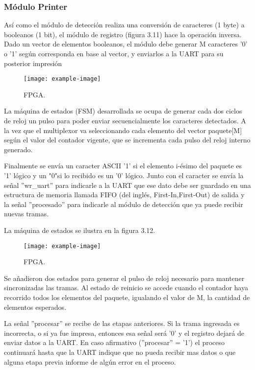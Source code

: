 \subsubsection{Módulo Printer}

\lipsum[1]

Así como el módulo de detección realiza una conversión de caracteres (1 byte) a booleanos (1 bit), el módulo de registro (figura 3.11) hace la operación inversa. Dado un vector de elementos booleanos, el módulo debe generar M caracteres ’0’
o ’1’ según corresponda en base al vector, y enviarlos a la UART para su posterior impresión

\begin{figure}[H]
	\centering
	\texttt{[image: example-image]}
	\centering\caption{FPGA.}
	\label{fig:XXX}
\end{figure}

La máquina de estados (FSM) desarrollada se ocupa de generar cada dos ciclos de reloj un pulso para poder enviar secuencialmente los caracteres detectados. A la vez que el multiplexor va seleccionando cada elemento del vector paquete[M] según el valor del contador vigente, que se incrementa cada pulso del reloj interno
generado.

Finalmente se envía un caracter ASCII ’1’ si el elemento i-ésimo del paquete es ’1’ lógico y un "0"si lo recibido es un ’0’ lógico. Junto con el caracter se envía la señal ”wr\_uart” para indicarle a la UART que ese dato debe ser guardado en una estructura de memoria llamada FIFO (del inglés, First-In,First-Out) de salida y la señal ”procesado” para indicarle al módulo de detección que ya puede recibir nuevas tramas. 

La máquina de estados se ilustra en la figura 3.12.

\begin{figure}[H]
	\centering
	\texttt{[image: example-image]}
	\centering\caption{FPGA.}
	\label{fig:XXX}
\end{figure}

Se añadieron dos estados para generar el pulso de reloj necesario para mantener sincronizadas las tramas. Al estado de reinicio se accede cuando el contador haya recorrido todos los elementos del paquete, igualando el valor de M, la cantidad de elementos esperados.

La señal ”procesar” se recibe de las etapas anteriores. Si la trama ingresada es incorrecta, o si ya fue impresa, entonces esa señal será ’0’ y el registro dejará de enviar datos a la UART. En caso afirmativo (”procesar” = ’1’) el proceso continuará hasta que la UART indique que no pueda recibir mas datos o que alguna etapa previa informe de algún error en el proceso.